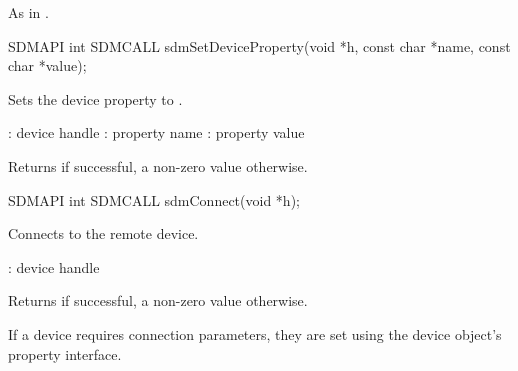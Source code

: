 \documentclass[a4paper,12pt,twoside,extrafontsizes]{memoir}
\begin{document}
\begin{funcret}
	As in .
\end{funcret}



\begin{cfuncprototype}
SDMAPI int SDMCALL sdmSetDeviceProperty(void *h, const char *name, const char *value);
\end{cfuncprototype}

\begin{funcdescr}
	Sets the device property  to .
\end{funcdescr}

\begin{funcparams}
	: device handle
	: property name
	: property value
\end{funcparams}

\begin{funcret}
	Returns  if successful, a non-zero value otherwise.
\end{funcret}



\begin{cfuncprototype}
SDMAPI int SDMCALL sdmConnect(void *h);
\end{cfuncprototype}

\begin{funcdescr}
	Connects to the remote device.
\end{funcdescr}

\begin{funcparams}
	: device handle
\end{funcparams}

\begin{funcret}
	Returns  if successful, a non-zero value otherwise.
\end{funcret}

\begin{funcremarks}
	If a device requires connection parameters, they are set using the device object's property interface.
\end{funcremarks}

\end{document}
